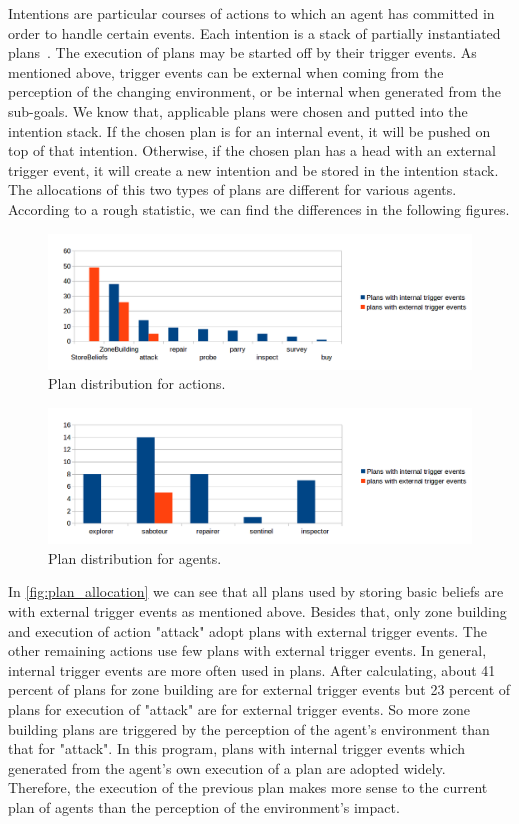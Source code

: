 Intentions are particular courses of actions to which an agent has committed in order to handle certain events.
Each intention is a stack of partially instantiated plans~\cite{rafael_Javabased_2007}.
The execution of plans may be started off by their trigger events.
As mentioned above, trigger events can be external when coming from the perception of the changing environment, or be internal when generated from the sub-goals.
We know that, applicable plans were chosen and putted into the intention stack.
If the chosen plan is for an internal event, it will be pushed on top of that intention.
Otherwise, if the chosen plan has a head with an external trigger event, it will create a new intention and be stored in the intention stack.
The allocations of this two types of plans are different for various agents.
According to a rough statistic, we can find the differences in the following figures.
\begin{figure}
  \centering
  \includegraphics[width=\textwidth]{images/BDI_plan_distribution_action}
  \caption{Plan distribution for actions.}
  \label{fig:plan_allocation}
\end{figure}
\begin{figure}
  \centering
  \includegraphics[width=\textwidth]{images/BDI_plan_distribution_role}
  \caption{Plan distribution for agents.}
  \label{fig:baselinex}
\end{figure}

In \autoref{fig:plan_allocation} we can see that all plans used by storing basic beliefs are with external trigger events as mentioned above.
Besides that, only zone building and execution of action "attack" adopt plans with external trigger events.
The other remaining actions use few plans with external trigger events.
In general, internal trigger events are more often used in plans.
After calculating, about 41 percent of plans for zone building are for external trigger events but 23 percent of plans for execution of "attack" are for external trigger events.
So more zone building plans are triggered by the perception of the agent's environment than that for "attack".
In this program, plans with internal trigger events which generated from the agent's own execution of a plan are adopted widely.
Therefore, the execution of the previous plan makes more sense to the current plan of agents than the perception of the environment's impact.

